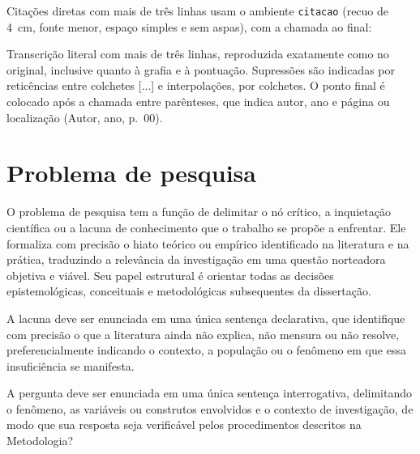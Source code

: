Citações diretas com mais de três linhas usam o ambiente \verb|citacao| (recuo de 4~cm, fonte menor, espaço simples e sem aspas), com a chamada ao final:

\begin{citacao}
  Transcrição literal com mais de três linhas, reproduzida exatamente como no original, inclusive quanto à grafia e à pontuação. Supressões são indicadas por reticências entre colchetes [...] e interpolações, por colchetes. O ponto final é colocado após a chamada entre parênteses, que indica autor, ano e página ou localização (Autor, ano, p.~00).
\end{citacao}

\section{Problema de pesquisa}
\label{sec:problema}
O problema de pesquisa tem a função de delimitar o nó crítico, a inquietação científica ou a lacuna de conhecimento que o trabalho se propõe a enfrentar. Ele formaliza com precisão o hiato teórico ou empírico identificado na literatura e na prática, traduzindo a relevância da investigação em uma questão norteadora objetiva e viável. Seu papel estrutural é orientar todas as decisões epistemológicas, conceituais e metodológicas subsequentes da dissertação.

\begin{lacuna*}
  \label{lac:principal}
  A lacuna deve ser enunciada em uma única sentença declarativa, que identifique com precisão o que a literatura ainda não explica, não mensura ou não resolve, preferencialmente indicando o contexto, a população ou o fenômeno em que essa insuficiência se manifesta.
\end{lacuna*}

\begin{pergunta*}
  \label{perg:principal}
  A pergunta deve ser enunciada em uma única sentença interrogativa, delimitando o fenômeno, as variáveis ou construtos envolvidos e o contexto de investigação, de modo que sua resposta seja verificável pelos procedimentos descritos na Metodologia?
\end{pergunta*}

